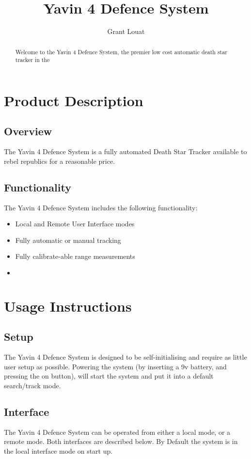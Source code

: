 \documentclass[]{report}
\title{Yavin 4 Defence System}
\author{Grant Louat}
\begin{document}
\maketitle

\begin{abstract}
Welcome to the Yavin 4 Defence System, the premier low cost automatic death star tracker in the 
\end{abstract}

\chapter{Product Description}
\section{Overview}
The Yavin 4 Defence System is a fully automated Death Star Tracker available to rebel republics for a reasonable price. 

\section{Functionality}
The Yavin 4 Defence System includes the following functionality:

\begin{itemize}
	\item Local and Remote User Interface modes
	\item Fully automatic or manual tracking
	\item Fully calibrate-able range measurements
	\item  
\end{itemize}

\chapter{Usage Instructions}
\section{Setup}
The Yavin 4 Defence System is designed to be self-initialising and require as little user setup as possible. Powering the system (by inserting a 9v battery, and pressing the on button), will start the system and put it into a default search/track mode.

\section{Interface}
The Yavin 4 Defence System can be operated from either a local mode, or a remote mode. Both interfaces are described below. By Default the system is in the local interface mode on start up.
\end{document}
